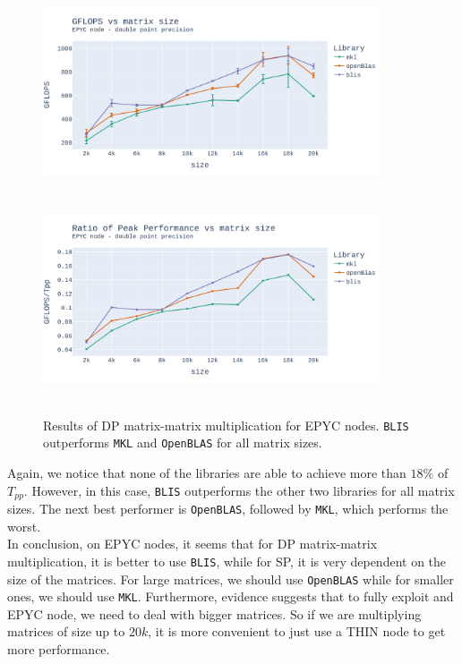 \documentclass{report}
\begin{document}
\begin{figure}[H]
\hspace*{-2.5cm}
\includegraphics[width=10cm, height=6cm]{./images/fixed_cores_epyc_double_gflops.pdf}
\includegraphics[width=10cm, height=6cm]{./images/fixed_cores_epyc_double_gflops_ratio.pdf}
\caption{\label{fig:fixed_cores_epyc_double} Results of DP matrix-matrix multiplication 
for EPYC nodes. \texttt{BLIS} outperforms \texttt{MKL} and \texttt{OpenBLAS} 
for all matrix sizes.}
\end{figure}

Again, we notice that none of the libraries are able to achieve more than $18\%$ 
of $T_{pp}$. However, in this case, \texttt{BLIS} outperforms the other two libraries 
for all matrix sizes. The next best performer is \texttt{OpenBLAS}, followed by 
\texttt{MKL}, which performs the worst.
\\

In conclusion, on EPYC nodes, it seems that for DP matrix-matrix multiplication, 
it is better to use \texttt{BLIS}, while for SP, it is very dependent on the 
size of the matrices. For large matrices, we should use \texttt{OpenBLAS}
while for smaller ones, we should use \texttt{MKL}. 
Furthermore, evidence suggests that to fully exploit and EPYC node, we need to 
deal with bigger matrices. So if we are multiplying matrices of size up to 
$20k$, it is more convenient to just use a THIN node to get more 
performance.
\end{document}
